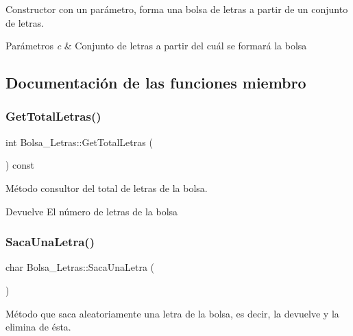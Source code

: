 Constructor con un parámetro, forma una bolsa de letras a partir de un conjunto de letras. 


\begin{DoxyParams}{Parámetros}
{\em c} & Conjunto de letras a partir del cuál se formará la bolsa \\
\hline
\end{DoxyParams}


\subsection{Documentación de las funciones miembro}
\mbox{\label{classBolsa__Letras_a25bbc49ca79e8182a2adc9243b145655}} 
\subsubsection{\texorpdfstring{Get\+Total\+Letras()}{GetTotalLetras()}}
{\footnotesize\ttfamily int Bolsa\+\_\+\+Letras\+::\+Get\+Total\+Letras (\begin{DoxyParamCaption}{ }\end{DoxyParamCaption}) const}



Método consultor del total de letras de la bolsa. 

\begin{DoxyReturn}{Devuelve}
El número de letras de la bolsa 
\end{DoxyReturn}
\mbox{\label{classBolsa__Letras_aa5540422db02a4bad84498ea5820e7f8}} 
\subsubsection{\texorpdfstring{Saca\+Una\+Letra()}{SacaUnaLetra()}}
{\footnotesize\ttfamily char Bolsa\+\_\+\+Letras\+::\+Saca\+Una\+Letra (\begin{DoxyParamCaption}{ }\end{DoxyParamCaption})}



Método que saca aleatoriamente una letra de la bolsa, es decir, la devuelve y la elimina de ésta. 

